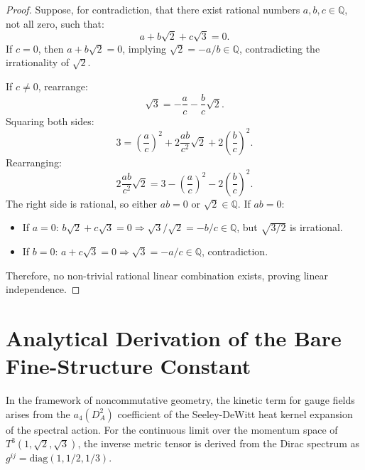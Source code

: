 \documentclass[onecolumn,aps,prd,superscriptaddress,nofootinbib,amsmath,amssymb]{revtex4-2}
\theoremstyle{definition}
\theoremstyle{remark}
\newcommand{\Tthree}{T^3(1,\sqrt{2},\sqrt{3})}
\begin{document}
\begin{proof}
Suppose, for contradiction, that there exist rational numbers $a, b, c \in \mathbb{Q}$, not all zero, such that:
\begin{equation}
a + b\sqrt{2} + c\sqrt{3} = 0.
\end{equation}
If $c = 0$, then $a + b\sqrt{2} = 0$, implying $\sqrt{2} = -a/b \in \mathbb{Q}$, contradicting the irrationality of $\sqrt{2}$.

If $c \neq 0$, rearrange:
\begin{equation}
\sqrt{3} = -\frac{a}{c} - \frac{b}{c} \sqrt{2}.
\end{equation}
Squaring both sides:
\begin{equation}
3 = \left(\frac{a}{c}\right)^2 + 2 \frac{ab}{c^2} \sqrt{2} + 2 \left(\frac{b}{c}\right)^2.
\end{equation}
Rearranging:
\begin{equation}
2 \frac{ab}{c^2} \sqrt{2} = 3 - \left(\frac{a}{c}\right)^2 - 2 \left(\frac{b}{c}\right)^2.
\end{equation}
The right side is rational, so either $ab = 0$ or $\sqrt{2} \in \mathbb{Q}$.
If $ab = 0$:
\begin{itemize}
\item If $a = 0$: $b\sqrt{2} + c\sqrt{3} = 0 \Rightarrow \sqrt{3}/\sqrt{2} = -b/c \in \mathbb{Q}$, but $\sqrt{3/2}$ is irrational.
\item If $b = 0$: $a + c\sqrt{3} = 0 \Rightarrow \sqrt{3} = -a/c \in \mathbb{Q}$, contradiction.
\end{itemize}
Therefore, no non-trivial rational linear combination exists, proving linear independence.
\end{proof}

\section{Analytical Derivation of the Bare Fine-Structure Constant}
\label{app:alpha_derivation}

In the framework of noncommutative geometry, the kinetic term for gauge fields arises from the $a_4(D_A^2)$ coefficient of the Seeley-DeWitt heat kernel expansion of the spectral action. For the continuous limit over the momentum space of $\Tthree$, the inverse metric tensor is derived from the Dirac spectrum as $g^{ij} = \text{diag}(1, 1/2, 1/3)$.
\end{document}
